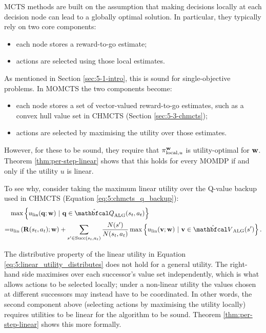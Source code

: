     MCTS methods are built on the assumption that making decisions locally at each decision node can lead to a globally optimal solution. In particular, they typically rely on two core components:
    \begin{itemize}
        \item each node stores a reward-to-go estimate;
        \item actions are selected using those local estimates.
    \end{itemize}
    As mentioned in Section \ref{sec:5-1-intro}, this is sound for single-objective problems. In MOMCTS the two components become: 
    \begin{itemize}
        \item each node stores a set of vector-valued reward-to-go estimates, such as a convex hull value set in CHMCTS (Section \ref{sec:5-3-chmcts}); 
        \item actions are selected by maximising the utility over those estimates.
    \end{itemize} 
    However, for these to be sound, they require that $\pi^{\mathbf{w}}_{\text{local},u}$ is utility-optimal for $\mathbf{w}$. Theorem \ref{thm:per-step-linear} shows that this holds for every MOMDP if and only if the utility $u$ is linear.

    To see why, consider taking the maximum linear utility over the Q-value backup used in CHMCTS (Equation \eqref{eq:5:chmcts_q_backup}):
    \begin{align}
        & \max \left\{ u_{\lin}(\bff{q};\bff{w})\ |\ \bff{q}\in \Qalg(s_t,a_t) \right\} \nonumber \\
        = & u_{\lin}\left(\bff{R}(s_t,a_t);\bff{w}\right) + \sum_{s'\in\suc{s_t}{a_t}} 
            \frac{N(s')}{N(s_t,a_t)} \max \left\{ u_{\lin}(\bff{v};\bff{w})\ |\ \bff{v}\in \Valg(s') \right\}. \label{eq:5:linear_utility_distributes}
    \end{align}

    The distributive property of the linear utility in Equation \eqref{eq:5:linear_utility_distributes} does not hold for a general utility. The right-hand side maximises over each successor's value set independently, which is what allows actions to be selected locally; under a non-linear utility the values chosen at different successors may instead have to be coordinated. In other words, the second component above (selecting actions by maximising the utility locally) requires utilities to be linear for the algorithm to be sound. Theorem \ref{thm:per-step-linear} shows this more formally.

